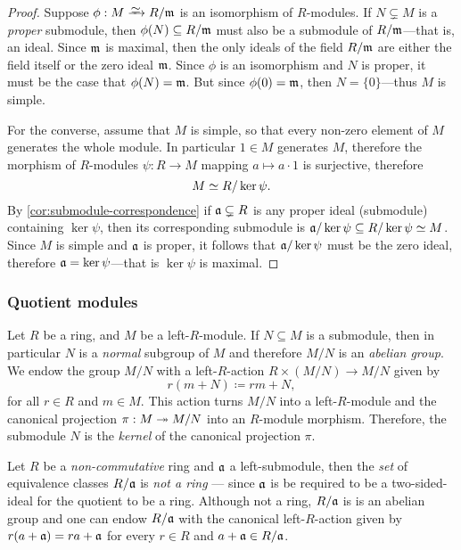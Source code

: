 \begin{proof}
Suppose \(\phi: M \isoto R/\ideal m\) is an isomorphism of \(R\)-modules. If
\(N \subsetneq M\) is a \emph{proper} submodule, then
\(\phi(N) \subseteq R/\mathfrak{m}\) must also be a submodule of
\(R/\mathfrak{m}\)---that is, an ideal. Since \(\mathfrak{m}\) is maximal, then the only
ideals of the field \(R/\mathfrak{m}\) are either the field itself or the zero ideal
\(\mathfrak{m}\). Since \(\phi\) is an isomorphism and \(N\) is proper, it must be
the case that \(\phi(N) = \mathfrak{m}\). But since \(\phi(0) = \mathfrak{m}\), then
\(N = \{0\}\)---thus \(M\) is simple.

For the converse, assume that \(M\) is simple, so that every non-zero element of
\(M\) generates the whole module. In particular \(1 \in M\) generates \(M\),
therefore the morphism of \(R\)-modules \(\psi: R \to M\) mapping
\(a \mapsto a \cdot 1\) is surjective, therefore
\[
M \simeq R/\ker \psi.
\]
By \cref{cor:submodule-correspondence} if \(\mathfrak{a} \subsetneq R\) is any
proper ideal (submodule) containing \(\ker \psi\), then its corresponding
submodule is \(\mathfrak{a}/\ker \psi \subseteq R/\ker \psi \simeq M\). Since \(M\)
is simple and \(\mathfrak{a}\) is proper, it follows that \(\mathfrak{a}/\ker \psi\)
must be the zero ideal, therefore \(\mathfrak{a} = \ker \psi\)---that is
\(\ker \psi\) is maximal.
\end{proof}

\subsubsection{Quotient modules}

\begin{definition}
\label{def:quotient-module}
Let \(R\) be a ring, and \(M\) be a left-\(R\)-module. If \(N \subseteq M\) is a
submodule, then in particular \(N\) is a \emph{normal} subgroup of \(M\) and
therefore \(M/N\) is an \emph{abelian group}. We endow the group \(M/N\) with a
left-\(R\)-action \(R \times (M/N) \to M/N\) given by
\[
r (m + N) \coloneq r m + N,
\]
for all \(r \in R\) and \(m \in M\). This action turns \(M/N\) into a
left-\(R\)-module and the canonical projection \(\pi: M \twoheadrightarrow M/N\) into an
\(R\)-module morphism. Therefore, the submodule \(N\) is the \emph{kernel} of
the canonical projection \(\pi\).
\end{definition}

\begin{example}
\label{exp:R/ideal-is-always-module}
Let \(R\) be a \emph{non-commutative} ring and \(\mathfrak{a}\) a left-submodule,
then the \emph{set} of equivalence classes \(R/\mathfrak{a}\) is \emph{not a ring}
--- since \(\mathfrak{a}\) is be required to be a two-sided-ideal for the quotient
to be a ring. Although not a ring, \(R/\mathfrak{a}\) is is an abelian group and
one can endow \(R/\mathfrak{a}\) with the canonical left-\(R\)-action given by
\(r (a + \mathfrak{a}) = r a + \mathfrak{a}\) for every \(r \in R\) and
\(a + \mathfrak{a} \in R/\mathfrak{a}\).
\end{example}


